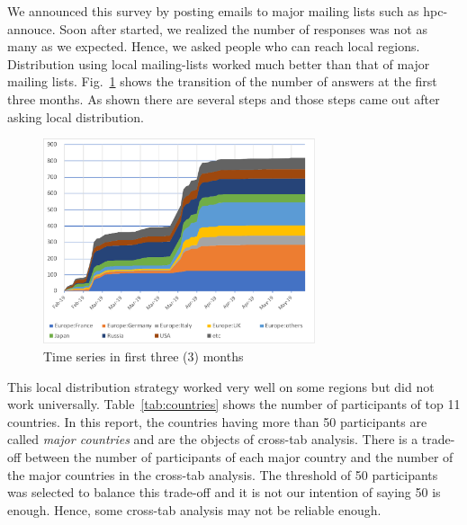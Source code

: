 \documentclass[conference,10pt,letterpaper]{IEEEtran}
\begin{document}
%
%
We announced this survey by posting emails to major mailing lists such
as hpc-annouce. Soon after started, we realized the number of
responses was not as many as we expected. Hence, we asked people who can
reach local regions. Distribution using local mailing-lists worked
much better than that of major mailing
lists. Fig.~\ref{fig:time-series} shows the transition of the number
of answers at the first three months. As shown there are several steps
and those steps came out after asking local distribution. 

\begin{figure}[htb]
\begin{center}
\includegraphics[width=8cm]{Figs/TimeSeries-Zoom.pdf}
\caption{Time series in first three (3) months}
\label{fig:time-series}
\end{center}
\end{figure}

This local distribution strategy worked very well on some regions but
did not work universally. Table~\ref{tab:countries} shows the number
of participants of top 11 countries. In this report, the
countries having more than 50 participants are called {\it major
  countries} and are the objects of cross-tab analysis. There is a
trade-off between the number of participants of each major country
and the number of the major countries in the cross-tab analysis. The
threshold of 50 participants was selected to balance this trade-off
and it is not our intention of saying 50 is enough. Hence, some cross-tab
analysis may not be reliable enough.
\end{document}
